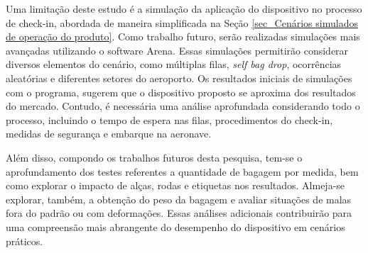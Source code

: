     Uma limitação deste estudo é a simulação da aplicação do dispositivo no processo de check-in, abordada de maneira simplificada na Seção \ref{sec_Cenários simulados de operação do produto}. Como trabalho futuro, serão realizadas simulações mais avançadas utilizando o software Arena. Essas simulações permitirão considerar diversos elementos do cenário, como múltiplas filas, \textit{self bag drop}, ocorrências aleatórias e diferentes setores do aeroporto. Os resultados iniciais de simulações com o programa, sugerem que o dispositivo proposto se aproxima dos resultados do mercado. Contudo, é necessária uma análise aprofundada considerando todo o processo, incluindo o tempo de espera nas filas, procedimentos do check-in, medidas de segurança e embarque na aeronave.
    
    Além disso, compondo os trabalhos futuros desta pesquisa, tem-se o aprofundamento dos testes referentes a quantidade de bagagem por medida, bem como explorar o impacto de alças, rodas e etiquetas nos resultados. Almeja-se explorar, também, a obtenção do peso da bagagem e avaliar situações de malas fora do padrão ou com deformações.  Essas análises adicionais contribuirão para uma compreensão mais abrangente do desempenho do dispositivo em cenários práticos.

 

    